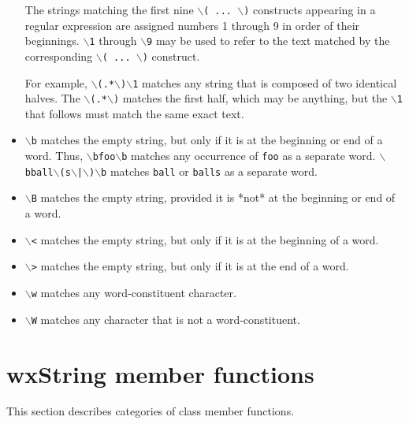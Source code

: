 \begin{itemize}
The strings matching the first nine {\tt $\backslash$( ... $\backslash$)} constructs
appearing in a regular expression are assigned numbers 1 through
9 in order of their beginnings. {\tt $\backslash$1} through {\tt $\backslash$9} may be used
to refer to the text matched by the corresponding {\tt $\backslash$( ... $\backslash$)} 
construct.

For example, {\tt $\backslash$(.*$\backslash$)$\backslash$1} matches any string that is composed of
two identical halves. The {\tt $\backslash$(.*$\backslash$)} matches the first half,
which may be anything, but the {\tt $\backslash$1} that follows must match the
same exact text.

\item \rtfsp
{\tt $\backslash$b} 
matches the empty string, but only if it is at the beginning or
end of a word. Thus, {\tt $\backslash$bfoo$\backslash$b} matches any occurrence of {\tt foo}
as a separate word. {\tt $\backslash$bball$\backslash$(s$\backslash$|$\backslash$)$\backslash$b} matches {\tt ball} or {\tt balls}
as a separate word.

\item \rtfsp
{\tt $\backslash$B} 
matches the empty string, provided it is *not* at the beginning
or end of a word.

\item \rtfsp
{\tt $\backslash$<} 
matches the empty string, but only if it is at the beginning of
a word.

\item \rtfsp
{\tt $\backslash$>} 
matches the empty string, but only if it is at the end of a word.

\item \rtfsp
{\tt $\backslash$w} 
matches any word-constituent character.

\item \rtfsp
{\tt $\backslash$W} 
matches any character that is not a word-constituent.

\end{itemize}





\section{wxString member functions}\label{wxstringcategories}


This section describes categories of  class
member functions.

